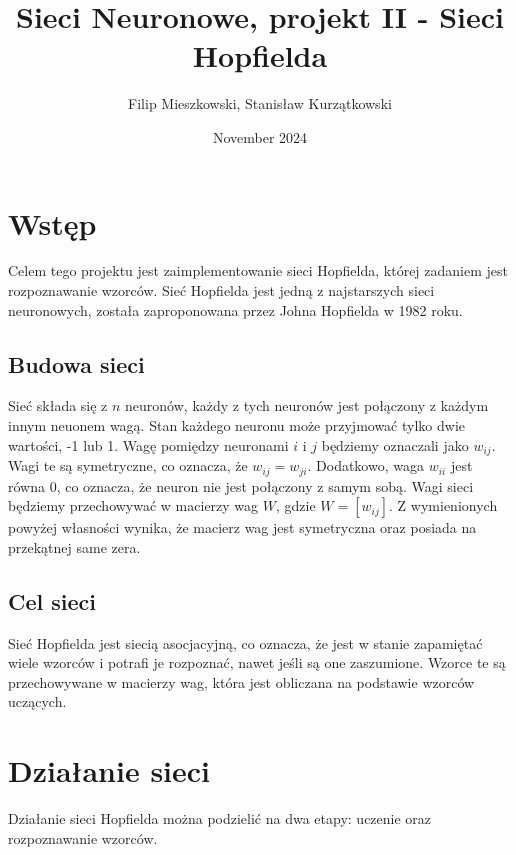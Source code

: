 \documentclass{article}
\title{Sieci Neuronowe, projekt II - Sieci Hopfielda}
\author{Filip Mieszkowski, Stanisław Kurzątkowski}
\date{November 2024}
\begin{document}
\maketitle

\section{Wstęp}
Celem tego projektu jest zaimplementowanie sieci Hopfielda, której zadaniem jest rozpoznawanie wzorców. 
Sieć Hopfielda jest jedną z najstarszych sieci neuronowych, została zaproponowana przez Johna Hopfielda w 1982 roku. 

\subsection{Budowa sieci}
Sieć składa się z $n$ neuronów, każdy z tych neuronów jest połączony z każdym innym neuonem wagą. 
Stan każdego neuronu może przyjmować tylko dwie wartości, -1 lub 1.
Wagę pomiędzy neuronami $i$ i $j$ będziemy oznaczali jako $w_{ij}$.
Wagi te są symetryczne, co oznacza, że $w_{ij} = w_{ji}$. 
Dodatkowo, waga $w_{ii}$ jest równa 0, co oznacza, że neuron nie jest połączony z samym sobą.
Wagi sieci będziemy przechowywać w macierzy wag $W$, gdzie $W = [w_{ij}]$.
Z wymienionych powyżej własności wynika, że macierz wag jest symetryczna oraz posiada na przekątnej same zera.


\subsection{Cel sieci}
Sieć Hopfielda jest siecią asocjacyjną, co oznacza, że jest w stanie zapamiętać wiele wzorców i potrafi je rozpoznać, 
nawet jeśli są one zaszumione. Wzorce te są przechowywane w macierzy wag, która jest obliczana na podstawie wzorców uczących.


\section{Działanie sieci}
Działanie sieci Hopfielda można podzielić na dwa etapy: uczenie oraz rozpoznawanie wzorców.
\end{document}
